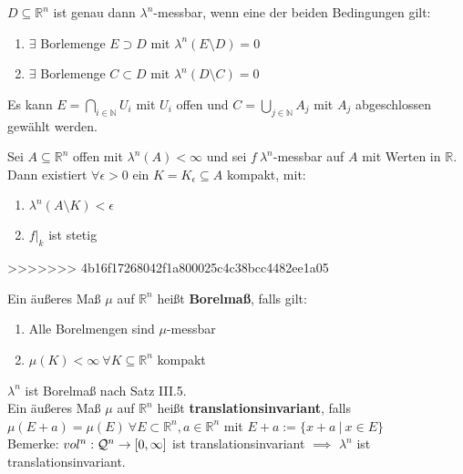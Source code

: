   \begin{theorem}
    $D \subseteq \mathbb{R}^n$ ist genau dann $\lambda^n$-messbar, wenn eine der beiden Bedingungen gilt:
    \begin{enumerate}[label=\roman*)]
      \item $\exists$ Borlemenge $E \supset D$ mit $\lambda^n(E \setminus D) = 0$
      \item $\exists$ Borlemenge $C \subset D$ mit $\lambda^n(D \setminus C) = 0$
    \end{enumerate}
    Es kann $E = \bigcap\limits_{i \in \mathbb{N}} U_i$ mit $U_i$ offen und $C = \bigcup\limits_{j \in \mathbb{N}} A_j$ mit $A_j$ abgeschlossen gewählt werden.
  \end{theorem}

  \newpage

  \begin{theorem}
    Sei $A \subseteq \mathbb{R}^n$ offen mit $\lambda^n(A) < \infty$ und sei $f \ \lambda^n$-messbar auf $A$ mit Werten in $\mathbb{R}$. Dann existiert $\forall \epsilon > 0$ ein $K = K_{\epsilon} \subseteq A$ kompakt, mit:
    \begin{enumerate}[label=\roman*)]
      \item $\lambda^n(A \setminus K) < \epsilon$
      \item $f|_k$ ist stetig
    \end{enumerate}
  \end{theorem}
>>>>>>> 4b16f17268042f1a800025c4c38bcc4482ee1a05


  \begin{definition}
    Ein äußeres Maß $\mu$ auf $\mathbb{R}^n$ heißt \textbf{Borelmaß}, falls gilt:
    \begin{enumerate}
      \item Alle Borelmengen sind $\mu$-messbar
      \item $\mu(K)<\infty \ \forall K \subseteq \mathbb{R}^n$ kompakt
    \end{enumerate}
  \end{definition}

  \begin{remark}
    $\lambda^n$ ist Borelmaß nach Satz III.5.\\
    Ein äußeres Maß $\mu$ auf $\mathbb{R}^n$ heißt \textbf{translationsinvariant}, falls \\
    $\mu(E + a) = \mu(E) \ \forall E \subset \mathbb{R}^n, a \in \mathbb{R}^n$ mit $E + a := \{x + a \ | \ x \in E\}$\\
    Bemerke: $vol^n:\mathcal{Q}^n \to [0, \infty]$ ist translationsinvariant $\implies$ $\lambda^n$ ist translationsinvariant.
  \end{remark}

